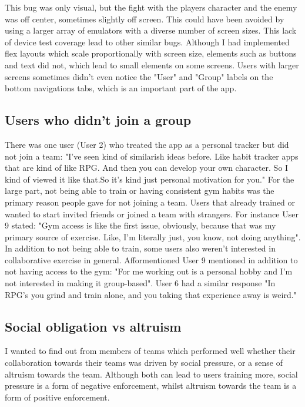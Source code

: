 \documentclass{l4proj}
\begin{document}
This bug was only visual, but the fight with the players character and the enemy was off center, sometimes slightly off screen. This could have been avoided by using a larger array of emulators with a diverse number of screen sizes. This lack of device test coverage lead to other similar bugs. Although I had implemented flex layouts which scale proportionally with screen size, elements such as buttons and text did not, which lead to small elements on some screens. Users with larger screens sometimes didn't even notice the "User" and "Group" labels on the bottom navigations tabs, which is an important part of the app.


\subsection{Users who didn't join a group}
There was one user (User 2) who treated the app as a personal tracker but did not join a team: "I've seen kind of similarish ideas before. Like habit tracker apps that are kind of like RPG. And then you can develop your own character. So I kind of viewed it like that.So it's kind just personal motivation for you." For the large part, not being able to train or having consistent gym habits was the primary reason people gave for not joining a team. Users that already trained or wanted to start invited friends or joined a team with strangers.  For instance User 9 stated: "Gym access is like the first issue, obviously, because that was my primary source of exercise. Like, I'm literally just, you know, not doing anything". In addition to not being able to train, some users also weren't interested in collaborative exercise in general. Afformentioned User 9 mentioned in addition to not having access to the gym: "For me working out is a personal hobby and I'm not interested in making it group-based". User 6 had a similar response "In RPG's you grind and train alone, and you taking that experience away is weird."

\subsection{Social obligation vs altruism}
I wanted to find out from members of teams which performed well whether their collaboration towards their teams was driven by social pressure, or a sense of altruism towards the team. Although both can lead to users training more, social pressure is a form of negative enforcement, whilst altruism towards the team is a form of positive enforcement.
\end{document}
